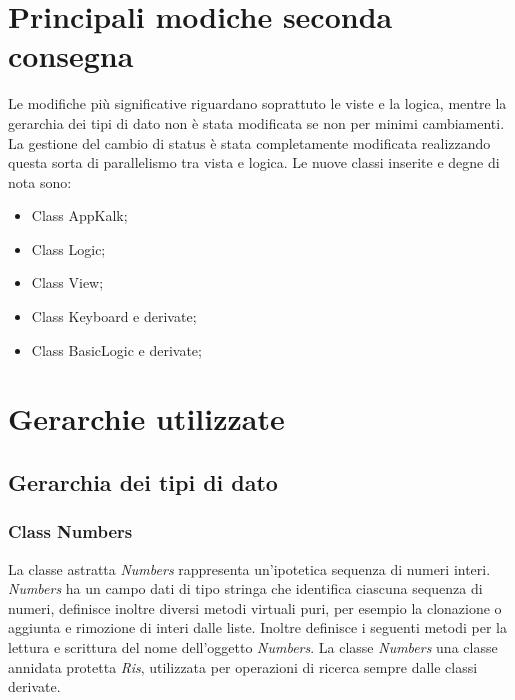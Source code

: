 \documentclass[a4paper,10pt]{article}
\begin{document}
        \section{Principali modiche seconda consegna}
        Le modifiche più significative riguardano soprattuto le viste e la logica, mentre la gerarchia dei tipi di dato non è stata modificata se non per minimi cambiamenti.
        La gestione del cambio di status è stata completamente modificata realizzando questa sorta di parallelismo tra vista e logica.
        Le nuove classi inserite e degne di nota sono:
        \begin{itemize}
            \item Class AppKalk;
            \item Class Logic;
            \item Class View;
            \item Class Keyboard e derivate;
            \item Class BasicLogic e derivate;
        \end{itemize}

        \section{Gerarchie utilizzate}
        \subsection{Gerarchia dei tipi di dato}
        \subsubsection{Class Numbers}
        La classe astratta \textit{Numbers} rappresenta un’ipotetica sequenza di numeri interi. \textit{Numbers} ha un campo dati di tipo stringa che identifica ciascuna sequenza di numeri, definisce inoltre diversi metodi virtuali puri, per esempio la clonazione o aggiunta e rimozione di interi dalle liste.
        Inoltre definisce i seguenti metodi per la lettura e scrittura del nome dell'oggetto \textit{Numbers}.
        La classe \textit{Numbers} una classe annidata protetta \textit{Ris}, utilizzata per operazioni di ricerca sempre dalle classi derivate.
        
\end{document}
